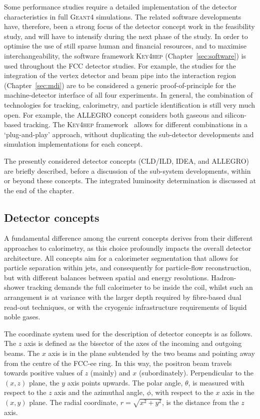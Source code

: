 Some performance studies require a detailed implementation of the detector characteristics in full \textsc{Geant4} simulations. 
The related software developments have, therefore, been a strong focus of the detector concept work in the feasibility study, 
and will have to intensify during the next phase of the study. 
In order to optimise the use of still sparse human and financial resources, and to maximise interchangeability, 
the software framework \textsc{Key4hep} (Chapter~\ref{sec:software}) is used throughout the FCC detector studies. 
For example, 
the studies for the integration of the vertex detector and beam pipe into the interaction region (Chapter~\ref{sec:mdi})
are to be considered a generic proof-of-principle for the machine-detector interface of all four experiments.  
In general, the combination of technologies for tracking, calorimetry, and particle identification is still very much open.
For example, the ALLEGRO concept considers both gaseous and silicon-based tracking. 
The \textsc{Key4hep} framework~\cite{SPack-CHEP2024-K4H} allows for different combinations in a `plug-and-play' approach, 
without duplicating the sub-detector developments and simulation implementations for each concept. 

The presently considered detector concepts (CLD/ILD, IDEA, and ALLEGRO) are briefly described, 
before a discussion of the sub-system developments, within or beyond these concepts. 
The integrated luminosity determination is discussed at the end of the chapter. 

\subsection{Detector concepts}
\label{sec:DetCon}

A fundamental difference among the current concepts derives from their different approaches to calorimetry, 
as this choice profoundly impacts the overall detector architecture. 
All concepts aim for a calorimeter segmentation that allows for particle separation within jets, 
and consequently for particle-flow reconstruction, 
but with different balances between spatial and energy resolutions. 
Hadron-shower tracking demands the full calorimeter to be inside the coil, 
whilst such an arrangement is at variance with the larger depth required by fibre-based dual read-out techniques, 
or with the cryogenic infrastructure requirements of liquid noble gases.

The coordinate system used for the description of detector concepts is as follows.
The $z$ axis is defined as the bisector of the axes of the incoming and outgoing beams. 
The $x$ axis is in the plane subtended by the two beams and pointing away from the centre of the FCC-ee ring. 
In this way, the positron beam travels towards positive values of $z$ (mainly) and $x$ (subordinately). 
Perpendicular to the $(x,z)$ plane, the $y$ axis points upwards. 
The polar angle, $\theta$, is measured with respect to the $z$ axis 
and the azimuthal angle, $\phi$, with respect to the $x$ axis in the $(x,y)$ plane. 
The radial coordinate, $r = \sqrt{x^2+y^2}$, is the distance from the $z$ axis.

